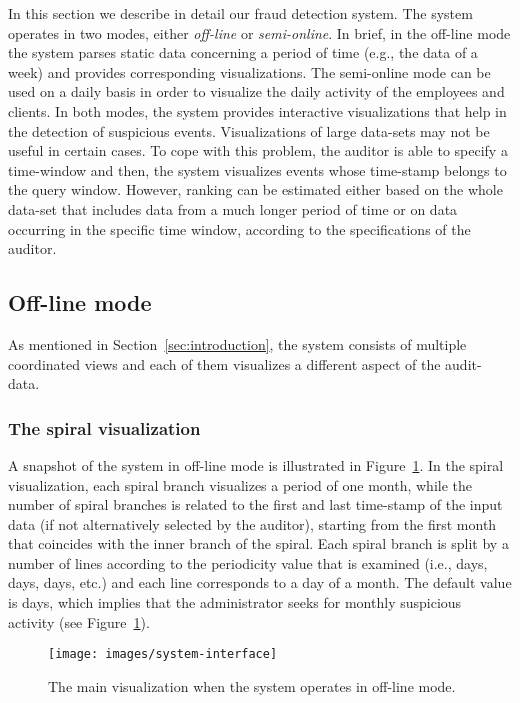 \documentclass[conference]{IEEEtran}
\begin{document}
In this section we describe in detail our fraud detection system.
The system operates in two modes, either \emph{off-line} or
\emph{semi-online}. In brief, in the off-line mode the system parses
static data concerning a period of time (e.g., the data of a week)
and provides corresponding visualizations. The semi-online mode can
be used on a daily basis in order to visualize the daily activity of
the employees and clients. In both modes, the system provides
interactive visualizations that help in the detection of suspicious
events. Visualizations of large data-sets may not be useful in
certain cases. To cope with this problem, the auditor is able to
specify a time-window and then, the system visualizes events whose
time-stamp belongs to the query window. However, ranking can be
estimated either based on the whole data-set that includes data from
a much longer  period of time or on data occurring in the specific
time window, according to the specifications of the auditor.

\subsection{Off-line mode}

As mentioned in Section~\ref{sec:introduction}, the system consists
of multiple coordinated views and each of them visualizes a
different aspect of the audit-data.

\subsubsection{The spiral visualization}

A snapshot of the system in off-line mode is illustrated in
Figure~\ref{fig:system-interface}. In the spiral visualization, each
spiral branch visualizes a period of one month, while the number of
spiral branches is related to the first and last time-stamp of the
input data (if not alternatively selected by the auditor), starting
from the first month that coincides with the inner branch of the
spiral. Each spiral branch is split by a number of lines according
to the periodicity value that is examined (i.e.,  days, 
days,  days, etc.) and each line corresponds to a day of a
month. The default value is  days, which implies that the
administrator seeks for monthly suspicious activity (see
Figure~\ref{fig:system-interface}).

\begin{figure}[h!tb]
  \centering
  \texttt{[image: images/system-interface]}
  \caption{The main visualization when the system operates in off-line mode.}
  \label{fig:system-interface}
\end{figure}
\end{document}
